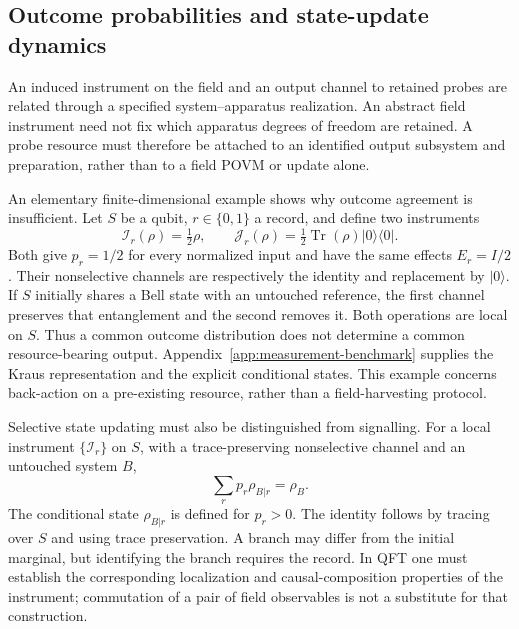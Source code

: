 \documentclass[pdflatex,sn-mathphys-num]{sn-jnl}
\newcommand{\Tr}{\operatorname{Tr}}
\begin{document}
\subsection{Outcome probabilities and state-update dynamics}
An induced instrument on the field and an output channel to retained probes are related through a specified system--apparatus realization. An abstract field instrument need not fix which apparatus degrees of freedom are retained. A probe resource must therefore be attached to an identified output subsystem and preparation, rather than to a field POVM or update alone.

An elementary finite-dimensional example shows why outcome agreement is insufficient. Let $S$ be a qubit, $r\in\{0,1\}$ a record, and define two instruments
\begin{equation}
\mathcal I_r(\rho)=\tfrac12\rho,\qquad
\mathcal J_r(\rho)=\tfrac12\Tr(\rho)|0\rangle\langle0|.
\label{eq:instrument-same-probability}
\end{equation}
Both give $p_r=1/2$ for every normalized input and have the same effects $E_r=I/2$. Their nonselective channels are respectively the identity and replacement by $|0\rangle$. If $S$ initially shares a Bell state with an untouched reference, the first channel preserves that entanglement and the second removes it. Both operations are local on $S$. Thus a common outcome distribution does not determine a common resource-bearing output. Appendix~\ref{app:measurement-benchmark} supplies the Kraus representation and the explicit conditional states. This example concerns back-action on a pre-existing resource, rather than a field-harvesting protocol.

Selective state updating must also be distinguished from signalling. For a local instrument $\{\mathcal I_r\}$ on $S$, with a trace-preserving nonselective channel and an untouched system $B$,
\begin{equation}
\sum_r p_r\rho_{B|r}=\rho_B.
\label{eq:selective-nonselective}
\end{equation}
The conditional state $\rho_{B|r}$ is defined for $p_r>0$. The identity follows by tracing over $S$ and using trace preservation. A branch may differ from the initial marginal, but identifying the branch requires the record. In QFT one must establish the corresponding localization and causal-composition properties of the instrument; commutation of a pair of field observables is not a substitute for that construction.
\end{document}
